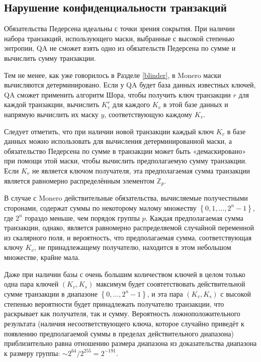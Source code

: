\documentclass{mrl}
\begin{document}
\subsection{Нарушение конфиденциальности транзакций}

Обязательства Педерсена идеальны с точки зрения сокрытия. При наличии набора транзакций, использующего маски, выбранные с высокой степенью энтропии, QA не сможет взять одно из обязательств Педерсена по сумме и вычислить сумму транзакции.

Тем не менее, как уже говорилось в Разделе \ref{blinder}, в Monero маски вычисляются детерминировано. Если у QA будет база данных известных ключей, QA сможет применить алгоритм Шора, чтобы получить ключ транзакции $r$ для каждой транзакции, вычислить $K_v^r$ для каждого $K_v$ в этой базе данных и напрямую вычислить их маску $y$, соответствующую каждому $K_v$. 

Следует отметить, что при наличии новой транзакции каждый ключ $K_v$ в базе данных можно использовать для вычисления детерминированной маски, а обязательство Педерсена по сумме в транзакции может быть «демаскировано» при помощи этой маски, чтобы вычислить предполагаемую сумму транзакции. Если $K_v$ не является ключом получателя, эта предполагаемая сумма транзакции является равномерно распределённым элементом $\mathbb{Z}_p$.

В случае с Monero действительные обязательства, вычисляемые получестными сторонами, содержат суммы по некоторому малому множеству $\left\{0, 1, \ldots, 2^{n} - 1\right\}$, где $2^n$ гораздо меньше, чем порядок группы $p$. Каждая предполагаемая сумма транзакции, однако, является равномерно распределяемой случайной переменной из скалярного поля, и вероятность, что предполагаемая сумма, соответствующая ключу $K_v$, не принадлежащему получателю, находится в этом небольшом множестве, крайне мала.

Даже при наличии базы с очень большим количеством ключей в целом только одна пара ключей $(K_v, K_s)$ максимум будет соовтетствовать действительной сумме транзакции в диапазоне $\left\{0, \ldots, 2^{n} - 1\right\}$, и эта пара $(K_v, K_s)$ с высокой степенью вероятности будет принадлежать получателю транзакции, что раскрывает как получателя, так и сумму. Вероятность ложноположительного результата (наличия несоответствующего ключа, которое случайно приведёт к появлению предполагаемой суммы в пределах действительного диапазона) приблизительно равна отношению размера диапазона из доказательства диапазона к размеру группы: $\sim2^{64}/2^{255} = 2^{-191}$.
\end{document}
